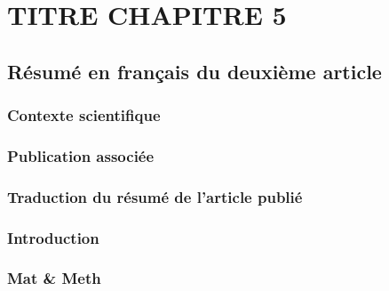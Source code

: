 \chapter{TITRE CHAPITRE 5}
\label{chap5}

\section{Résumé en français du deuxième article}

\subsection{Contexte scientifique}

\subsection{Publication associée}

\subsection{Traduction du résumé de l'article publié}
\hypertarget{introduction}{%
\subsection{Introduction}\label{introduction}}

\hypertarget{mat-meth}{%
\subsection{Mat \& Meth}\label{mat-meth}}
